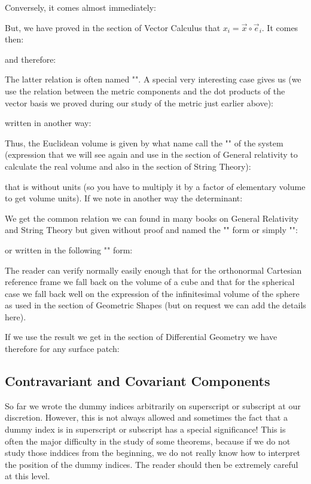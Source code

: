 	Conversely, it comes almost immediately:
	
	But, we have proved in the section of Vector Calculus that $x_i=\vec{x}\circ\vec{e}_i$. It comes then:
	
	and therefore:
	
	The latter relation is often named "". A special very interesting case gives us (we use the relation between the metric components and the dot products of the vector basis we proved during our study of the metric just earlier above):
	
	written in another way:
	
	Thus, the Euclidean volume  is given by what name call the "" of the system (expression that we will see again and use in the section of General relativity to calculate the real volume and also in the section of String Theory):
		
	that is without units (so you have to multiply it by a factor of elementary volume to get volume units). If we note in another way the determinant:
		
	We get the common relation we can found in many books on General Relativity and String Theory but given without proof and named the "" form or simply "":
		
	or written in the following "" form:
	
	The reader can verify normally easily enough that for the orthonormal Cartesian reference frame we fall back on the volume of a cube and that for the spherical case we fall back well on the expression of the infinitesimal volume of the sphere as used in the section of Geometric Shapes (but on request we can add the details here).
	
	If we use the result we get in the section of Differential Geometry we have therefore for any surface patch:
	

	
	\subsection{Contravariant and Covariant Components}
	So far we wrote the dummy indices arbitrarily on superscript or subscript at our discretion. However, this is not always allowed and sometimes the fact that a dummy index is in superscript or subscript has a special significance! This is often the major difficulty in the study of some theorems, because if we do not study those inddices from the beginning, we do not really know how to interpret the position of the dummy indices. The reader should then be extremely careful at this level.

